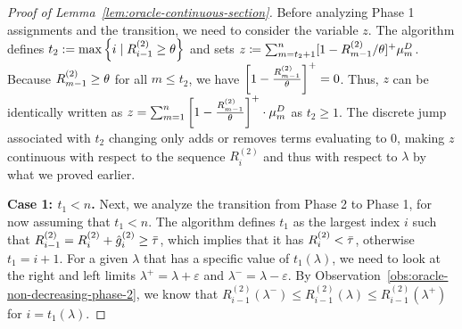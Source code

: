 \begin{proof}[Proof of Lemma~\ref{lem:oracle-continuous-section}]
    Before analyzing Phase 1 assignments and the transition, we need to consider the variable $z$.
    The algorithm defines $t_2 := \max\left\{i \mid R_{i-1}^{(2)} \geq \theta\right\}$ and sets $z\coloneqq \sum_{m=t_2+1}^n [1-R_{m-1}^{(2)}/\theta]^+\mu_m^D$.
    Because $R_{m-1}^{(2)} \ge \theta$ for all $m \le t_2$, we have $\left[1 - \frac{R_{m-1}^{(2)}}{\theta}\right]^+ = 0$.
    Thus, $z$ can be identically written as $z = \sum_{m=1}^n \left[1 - \frac{R_{m-1}^{(2)}}{\theta}\right]^+ \cdot \mu_m^D$ as $t_2\geq 1$.
    The discrete jump associated with $t_2$ changing only adds or removes terms evaluating to $0$, making $z$ continuous with respect to the sequence $R_i^{(2)}$ and thus with respect to $\lambda$ by what we proved earlier.

    \smallskip
    \noindent\textbf{Case 1: $t_1<n$.}
    Next, we analyze the transition from Phase 2 to Phase 1, for now assuming that $t_1<n$. The algorithm defines $t_1$ as the largest index $i$ such that $R_{i-1}^{(2)} = R_i^{(2)}+\hat{g}_i^{(2)} \ge \bar\tau$, which implies that it has $R_{i}^{(2)}<\bar\tau$, otherwise $t_1=i+1$. For a given $\lambda$ that has a specific value of $t_1(\lambda)$, we need to look at the right and left limits $\lambda^+=\lambda+\varepsilon$ and $\lambda^-=\lambda-\varepsilon$. By Observation~\ref{obs:oracle-non-decreasing-phase-2}, we know that $R_{i-1}^{(2)}(\lambda^-)\leq R_{i-1}^{(2)}(\lambda)\leq R_{i-1}^{(2)}(\lambda^+)$ for $i=t_1(\lambda)$.


\end{proof}
